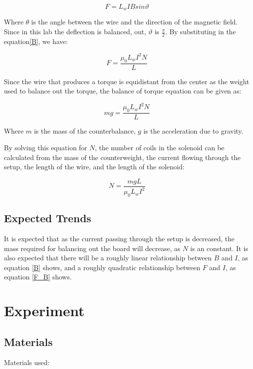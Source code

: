 \documentclass[11pt]{report}
\begin{document}
\begin{equation} \label{F}
F = L_wIBsin\vartheta
\end{equation}

Where $\theta$ is the angle between the wire and the direction of the magnetic field. Since in this lab the deflection is balanced, out, $\vartheta$ is $\frac{\pi}{2}$. By substituting in the equation\eqref{B}, we have:

\begin{equation} \label{F_B}
F = \frac{\mu_0L_wI^2N}{L}
\end{equation}

Since the wire that produces a torque is equidistant from the center as the weight used to balance out the torque, the balance of torque equation can be given as:

\begin{equation}
mg = \frac{\mu_0L_wI^2N}{L}
\end{equation}

Where $m$ is the mass of the counterbalance, $g$ is the acceleration due to gravity.

By solving this equation for $N$, the number of coils in the solenoid can be calculated from the mass of the counterweight, the current flowing through the setup, the length of the wire, and the length of the solenoid:

\begin{equation} \label{N}
N = \frac{mgL}{\mu_0L_wI^2}
\end{equation}

\subsection{Expected Trends}
It is expected that as the current passing through the setup is decreased, the mass required for balancing out the board will decrease, as $N$ is an constant. It is also expected that there will be a roughly linear relationship between $B$ and $I$, as equation \eqref{B} shows, and a roughly quadratic relationship between $F$ and $I$, as equation \eqref{F_B} shows.

\section{Experiment}

\subsection{Materials}
Materials used:
\end{document}
